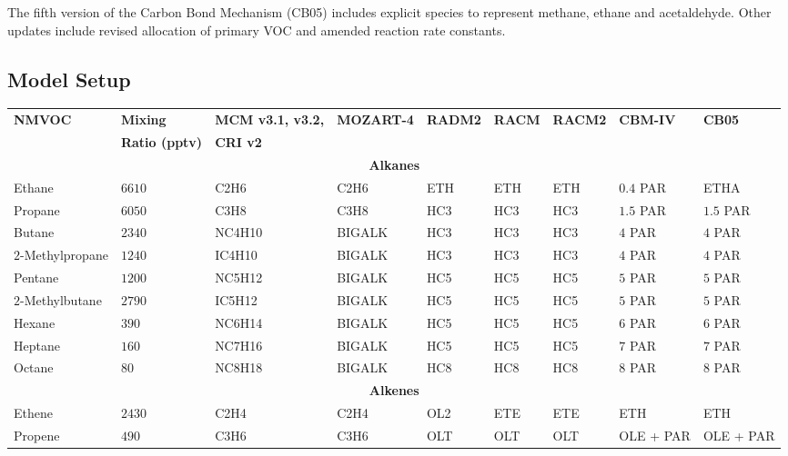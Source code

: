 The fifth version of the Carbon Bond Mechanism (CB05) \citep{Yarwood:2005} includes explicit species to represent methane, ethane and acetaldehyde. 
Other updates include revised allocation of primary VOC and amended reaction rate constants.

\subsection{Model Setup} \label{ss:model_setup}

\begin{sidewaystable}
    \centering
    \begin{tabular}{lllllllll}
        \hline \hline
        \multirow{2}{*}{\textbf{NMVOC}} & \textbf{Mixing} & \textbf{MCM v3.1, v3.2,} & \multirow{2}{*}{\textbf{MOZART-4}} & \multirow{2}{*}{\textbf{RADM2}} & \multirow{2}{*}{\textbf{RACM}} & \multirow{2}{*}{\textbf{RACM2}} & \multirow{2}{*}{\textbf{CBM-IV}} & \multirow{2}{*}{\textbf{CB05}}\\ & \textbf{Ratio (pptv)} & \textbf{CRI v2} & & & & & & \\ 
        \hline \hline \multicolumn{9}{c}{\textbf{Alkanes}}  \\ \hline
        Ethane & $6610$ & C2H6 & C2H6 & ETH & ETH & ETH & $0.4$ PAR & ETHA \\
        Propane  & $6050$ & C3H8 & C3H8 & HC3 & HC3 & HC3 & $1.5$ PAR & $1.5$ PAR \\
        Butane & $2340$ & NC4H10 & BIGALK & HC3 & HC3 & HC3 & $4$ PAR & $4$ PAR \\
        $2$-Methylpropane & $1240$ & IC4H10 & BIGALK & HC3 & HC3 & HC3 & $4$ PAR & $4$ PAR \\
        Pentane & $1200$ & NC5H12 & BIGALK & HC5 & HC5 & HC5 & $5$ PAR & $5$ PAR \\
        $2$-Methylbutane & $2790$ & IC5H12 & BIGALK & HC5 & HC5 & HC5 & $5$ PAR & $5$ PAR \\
        Hexane & $390$ & NC6H14 & BIGALK & HC5 & HC5 & HC5 & $6$ PAR & $6$ PAR \\
        Heptane & $160$ & NC7H16 &  BIGALK & HC5 & HC5 & HC5 & $7$ PAR & $7$ PAR \\
        Octane & $80$ & NC8H18 & BIGALK & HC8 & HC8 & HC8 & $8$ PAR & $8$ PAR \\ \hline 
        \multicolumn{9}{c}{\textbf{Alkenes}} \\ \hline
        Ethene & $2430$ & C2H4 & C2H4 & OL2 & ETE & ETE & ETH & ETH \\
        Propene & $490$ & C3H6 & C3H6 & OLT & OLT & OLT & OLE + PAR & OLE + PAR \\ 

\end{tabular}
\end{sidewaystable}
